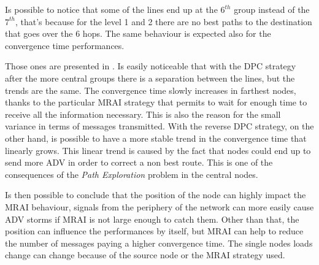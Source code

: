Is possible to notice that some of the lines end up at the $6^{th}$ group instead
of the $7^{th}$, that's because for the level \num{1} and \num{2} there are
no best paths to the destination that goes over the \num{6} hops.
The same behaviour is expected also for the convergence time performances.

Those ones are presented in .
Is easily noticeable that with the \ac{DPC} strategy after the
more central groups there is a separation between the lines, but the trends
are the same.
The convergence time slowly increases in farthest nodes, thanks to the particular
\ac{MRAI} strategy that permits to wait for enough time to receive all the information
necessary.
This is also the reason for the small variance in terms of messages transmitted.
With the reverse \ac{DPC} strategy, on the other hand, is possible to have a
more stable trend in the convergence time that linearly grows.
This linear trend is caused by the fact that nodes could end up to send more
\ac{ADV} in order to correct a non best route.
This is one of the consequences of the \textit{Path Exploration} problem in
the central nodes.

Is then possible to conclude that the position of the node can highly impact
the \ac{MRAI} behaviour, signals from the periphery of the network can more
easily cause \ac{ADV} storms if \ac{MRAI} is not large enough to catch them.
Other than that, the position can influence the performances by itself, but
\ac{MRAI} can help to reduce the number of messages paying a higher convergence
time.
The single nodes loads change can change because of the source node or the
\ac{MRAI} strategy used.

